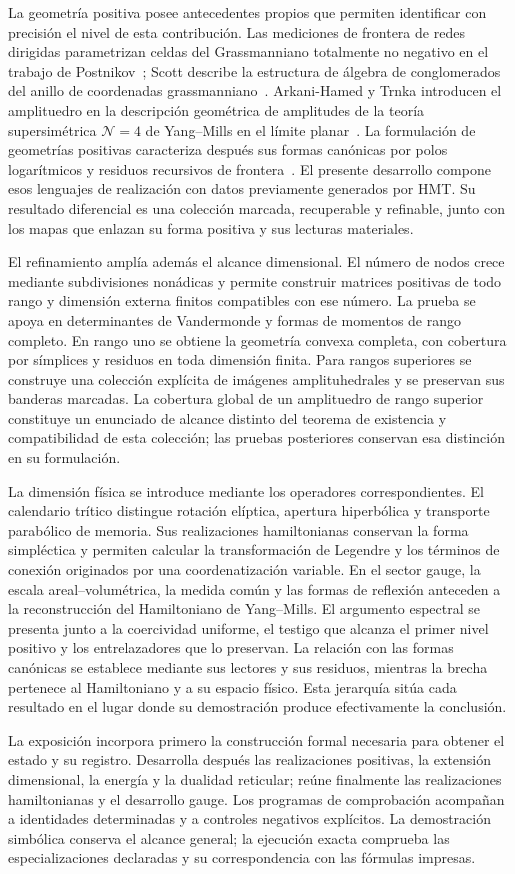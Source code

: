La geometría positiva posee antecedentes propios que permiten identificar
con precisión el nivel de esta contribución. Las mediciones de frontera
de redes dirigidas parametrizan celdas del Grassmanniano totalmente no
negativo en el trabajo de Postnikov~\cite{postnikov}; Scott describe la
estructura de álgebra de conglomerados del anillo de coordenadas
grassmanniano~\cite{scott}. Arkani-Hamed y Trnka introducen el amplituedro
en la descripción geométrica de amplitudes de la teoría supersimétrica
\(\mathcal N=4\) de Yang--Mills en el límite planar~\cite{amplituhedron}.
La formulación de geometrías positivas caracteriza después sus formas
canónicas por polos logarítmicos y residuos recursivos de
frontera~\cite{positive}. El presente desarrollo compone esos lenguajes
de realización con datos previamente generados por HMT. Su resultado
diferencial es una colección marcada, recuperable y refinable, junto con
los mapas que enlazan su forma positiva y sus lecturas materiales.

El refinamiento amplía además el alcance dimensional. El número de nodos
crece mediante subdivisiones nonádicas y permite construir matrices
positivas de todo rango y dimensión externa finitos compatibles con ese
número. La prueba se apoya en determinantes de Vandermonde y formas de
momentos de rango completo. En rango uno se obtiene la geometría convexa
completa, con cobertura por símplices y residuos en toda dimensión finita.
Para rangos superiores se construye una colección explícita de imágenes
amplituhedrales y se preservan sus banderas marcadas. La cobertura global
de un amplituedro de rango superior constituye un enunciado de alcance
distinto del teorema de existencia y compatibilidad de esta colección; las
pruebas posteriores conservan esa distinción en su formulación.

La dimensión física se introduce mediante los operadores correspondientes.
El calendario trítico distingue rotación elíptica, apertura hiperbólica y
transporte parabólico de memoria. Sus realizaciones hamiltonianas conservan
la forma simpléctica y permiten calcular la transformación de Legendre y
los términos de conexión originados por una coordenatización variable. En el sector
gauge, la escala areal--volumétrica, la medida común y las formas de
reflexión anteceden a la reconstrucción del Hamiltoniano de Yang--Mills.
El argumento espectral se presenta junto a la coercividad uniforme, el
testigo que alcanza el primer nivel positivo y los entrelazadores que lo
preservan. La relación con las formas canónicas se establece mediante sus
lectores y sus residuos, mientras la brecha pertenece al Hamiltoniano y a
su espacio físico. Esta jerarquía sitúa cada resultado en el lugar donde
su demostración produce efectivamente la conclusión.

La exposición incorpora primero la construcción formal necesaria para
obtener el estado y su registro. Desarrolla después las realizaciones
positivas, la extensión dimensional, la energía y la dualidad reticular;
reúne finalmente las realizaciones hamiltonianas y el desarrollo gauge.
Los programas de comprobación acompañan a identidades determinadas y a
controles negativos explícitos. La demostración simbólica conserva el
alcance general; la ejecución exacta comprueba las especializaciones
declaradas y su correspondencia con las fórmulas impresas.
